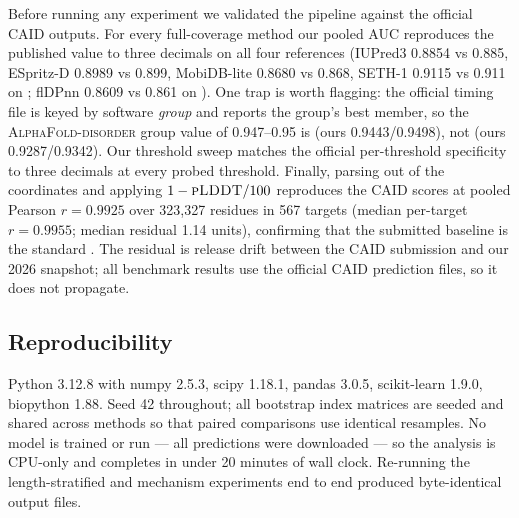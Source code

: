 Before running any experiment we validated the pipeline against the official CAID outputs.
For every full-coverage method our pooled AUC reproduces the published value to three decimals
on all four references (\eg IUPred3 0.8854 vs 0.885, ESpritz-D 0.8989 vs 0.899, MobiDB-lite
0.8680 vs 0.868, SETH-1 0.9115 vs 0.911 on \caidtwo \dpdb; flDPnn 0.8609 vs 0.861 on \caidthree
\dpdb). One trap is worth flagging: the official timing file is keyed by software \emph{group}
and reports the group's best member, so the \textsc{AlphaFold-disorder} group value of
0.947--0.95 is \afrsa (ours 0.9443/0.9498), not \afplddt (ours 0.9287/0.9342). Our threshold
sweep matches the official per-threshold specificity to three decimals at every probed
threshold. Finally, parsing \plddt out of the \afdb coordinates and applying $1-\textsc{pLDDT}/100$
reproduces the CAID scores at pooled Pearson $r = 0.9925$ over 323,327 residues in 567 targets
(median per-target $r=0.9955$; median residual 1.14 \plddt units), confirming that the submitted
baseline is the standard \plddt. The residual is \afdb release drift between the CAID submission
and our 2026 snapshot; all benchmark results use the official CAID prediction files, so it does
not propagate.

\subsection{Reproducibility}

Python 3.12.8 with numpy 2.5.3, scipy 1.18.1, pandas 3.0.5, scikit-learn 1.9.0, biopython 1.88.
Seed 42 throughout; all bootstrap index matrices are seeded and shared across methods so that
paired comparisons use identical resamples. No model is trained or run --- all predictions were
downloaded --- so the analysis is CPU-only and completes in under 20 minutes of wall clock.
Re-running the length-stratified and mechanism experiments end to end produced byte-identical
output files.
